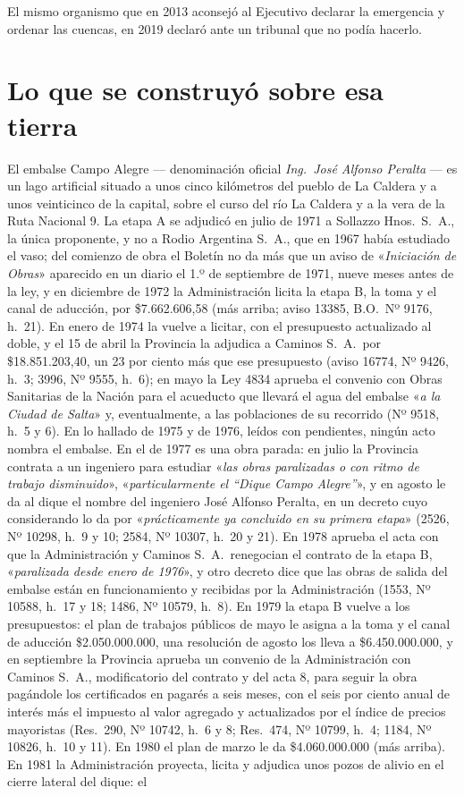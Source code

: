 El mismo organismo que en 2013 aconsejó al Ejecutivo declarar la emergencia y ordenar las cuencas, en 2019 declaró ante un tribunal que no podía hacerlo.

\section{Lo que se construyó sobre esa tierra}

El embalse Campo Alegre --- denominación oficial \textit{Ing.\ José Alfonso Peralta} --- es un lago artificial situado a unos cinco kilómetros del pueblo de La Caldera y a unos veinticinco de la capital, sobre el curso del río La Caldera y a la vera de la Ruta Nacional 9. La etapa A se adjudicó en julio de 1971 a Sollazzo Hnos.\ S.\ A., la única proponente, y no a Rodio Argentina S.\ A., que en 1967 había estudiado el vaso; del comienzo de obra el Boletín no da más que un aviso de «\textit{Iniciación de Obras}» aparecido en un diario el 1.º de septiembre de 1971, nueve meses antes de la ley, y en diciembre de 1972 la Administración licita la etapa B, la toma y el canal de aducción, por \$7.662.606,58 (más arriba; aviso 13385, B.O.\ Nº 9176, h.\ 21). En enero de 1974 la vuelve a licitar, con el presupuesto actualizado al doble, y el 15 de abril la Provincia la adjudica a Caminos S.\ A.\ por \$18.851.203,40, un 23 por ciento más que ese presupuesto (aviso 16774, Nº 9426, h.\ 3; 3996, Nº 9555, h.\ 6); en mayo la Ley 4834 aprueba el convenio con Obras Sanitarias de la Nación para el acueducto que llevará el agua del embalse «\textit{a la Ciudad de Salta}» y, eventualmente, a las poblaciones de su recorrido (Nº 9518, h.\ 5 y 6). En lo hallado de 1975 y de 1976, leídos con pendientes, ningún acto nombra el embalse. En el de 1977 es una obra parada: en julio la Provincia contrata a un ingeniero para estudiar «\textit{las obras paralizadas o con ritmo de trabajo disminuido}», «\textit{particularmente el ``Dique Campo Alegre''}», y en agosto le da al dique el nombre del ingeniero José Alfonso Peralta, en un decreto cuyo considerando lo da por «\textit{prácticamente ya concluido en su primera etapa}» (2526, Nº 10298, h.\ 9 y 10; 2584, Nº 10307, h.\ 20 y 21). En 1978 aprueba el acta con que la Administración y Caminos S.\ A.\ renegocian el contrato de la etapa B, «\textit{paralizada desde enero de 1976}», y otro decreto dice que las obras de salida del embalse están en funcionamiento y recibidas por la Administración (1553, Nº 10588, h.\ 17 y 18; 1486, Nº 10579, h.\ 8). En 1979 la etapa B vuelve a los presupuestos: el plan de trabajos públicos de mayo le asigna a la toma y el canal de aducción \$2.050.000.000, una resolución de agosto los lleva a \$6.450.000.000, y en septiembre la Provincia aprueba un convenio de la Administración con Caminos S.\ A., modificatorio del contrato y del acta 8, para seguir la obra pagándole los certificados en pagarés a seis meses, con el seis por ciento anual de interés más el impuesto al valor agregado y actualizados por el índice de precios mayoristas (Res.\ 290, Nº 10742, h.\ 6 y 8; Res.\ 474, Nº 10799, h.\ 4; 1184, Nº 10826, h.\ 10 y 11). En 1980 el plan de marzo le da \$4.060.000.000 (más arriba). En 1981 la Administración proyecta, licita y adjudica unos pozos de alivio en el cierre lateral del dique: el 